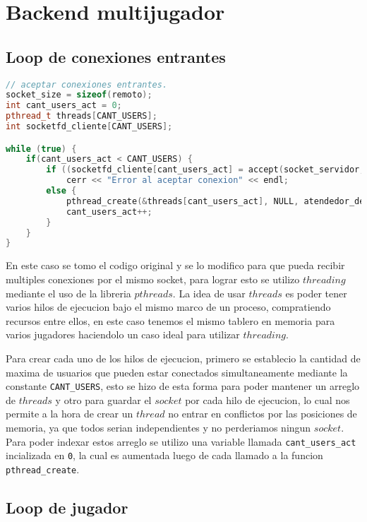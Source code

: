 \section{Backend multijugador}

\subsection{Loop de conexiones entrantes}

\begin{lstlisting}[language=C++, breaklines=true]
// aceptar conexiones entrantes.
socket_size = sizeof(remoto);
int cant_users_act = 0;
pthread_t threads[CANT_USERS];
int socketfd_cliente[CANT_USERS];

while (true) {
	if(cant_users_act < CANT_USERS) {
		if ((socketfd_cliente[cant_users_act] = accept(socket_servidor, (struct sockaddr*) &remoto, (socklen_t*) &socket_size)) == -1)
			cerr << "Error al aceptar conexion" << endl;
		else {
			pthread_create(&threads[cant_users_act], NULL, atendedor_de_jugador, &socketfd_cliente[cant_users_act]);
			cant_users_act++;
		}
	}
}
\end{lstlisting}

En este caso se tomo el codigo original y se lo modifico para que pueda recibir multiples conexiones por el mismo socket, para lograr esto se utilizo $threading$ mediante el uso de la libreria $pthreads$. La idea de usar $threads$ es poder tener varios hilos de ejecucion bajo el mismo marco de un proceso, compratiendo recursos entre ellos, en este caso tenemos el mismo tablero en memoria para varios jugadores haciendolo un caso ideal para utilizar $threading$.

Para crear cada uno de los hilos de ejecucion, primero se establecio la cantidad de maxima de usuarios que pueden estar conectados simultaneamente mediante la constante \texttt{CANT\_USERS}, esto se hizo de esta forma para poder mantener un arreglo de $threads$ y otro para guardar el $socket$ por cada hilo de ejecucion, lo cual nos permite a la hora de crear un $thread$ no entrar en conflictos por las posiciones de memoria, ya que todos serian independientes y no perderiamos ningun $socket$. Para poder indexar estos arreglo se utilizo una variable llamada \texttt{cant\_users\_act} incializada en \texttt{0}, la cual es aumentada luego de cada llamado a la funcion \texttt{pthread\_create}.

\subsection{Loop de jugador}

